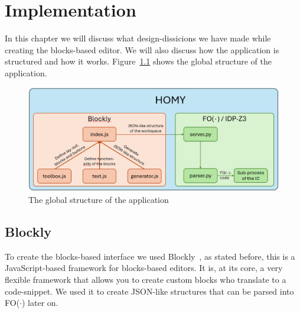 \documentclass[11pt,a4paper]{report}
\newcommand{\fodot}{FO($\cdot$)\xspace}
\begin{document}
\chapter{Implementation}
In this chapter we will discuss what design-dissicions we have made while creating the blocks-based editor. We will also discuss how the application is structured and how it works. Figure~\ref{fig:global_structure} shows the global structure of the application.

\begin{figure}
    \centering
    \includegraphics[width=1\linewidth]{images/global_structure.png}
    \caption{The global structure of the application}
    \label{fig:global_structure}
\end{figure}
\section{Blockly}
To create the blocks-based interface we used Blockly~\cite{Blockly}, as stated before, this is a JavaScript-based framework for blocks-based editors. It is, at its core, a very flexible framework that allows you to create custom blocks who translate to a code-snippet. We used it to create JSON-like structures that can be parsed into \fodot later on.
\end{document}
